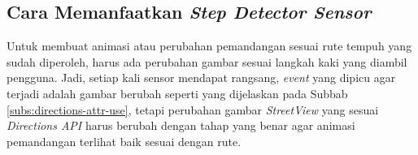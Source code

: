 \subsection{Cara Memanfaatkan \textit{Step Detector Sensor}}
Untuk membuat animasi atau perubahan pemandangan sesuai rute tempuh yang sudah diperoleh, harus ada perubahan gambar sesuai langkah kaki yang diambil pengguna. Jadi, setiap kali sensor mendapat rangsang, \textit{event} yang dipicu agar terjadi adalah gambar berubah seperti yang dijelaskan pada Subbab \ref{subs:directions-attr-use}, tetapi perubahan gambar \textit{StreetView} yang sesuai \textit{Directions API} harus berubah dengan tahap yang benar agar animasi pemandangan terlihat baik sesuai dengan rute. 